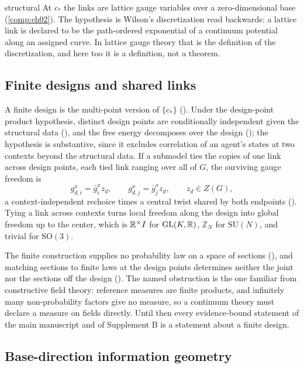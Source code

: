 \begin{analogy}{structural}
At \(c_*\) the links are lattice gauge variables over a zero-dimensional base (\cref{comp:ch02}). The
hypothesis is Wilson's discretization read backwards: a lattice link is declared to be the path-ordered
exponential of a continuum potential along an assigned curve. In lattice gauge theory that is the
definition of the discretization, and here too it is a definition, not a theorem.
\end{analogy}

\subsection{Finite designs and shared links}
\label{comp:sb-designs}

A finite design is the multi-point version of \(\{c_*\}\) (). Under the
design-point product hypothesis, distinct design points are conditionally independent given the
structural data (), and the free energy decomposes over the design
(); the hypothesis is substantive, since it excludes
correlation of an agent's states at two contexts beyond the structural data. If a submodel ties the
copies of one link across design points, each tied link ranging over all of \(G\), the surviving gauge
freedom is
\[
g_{d,i}^x=\bar g_i^xz_d,\qquad g_{d,j}^x=\bar g_j^xz_d,\qquad z_d\in Z(G),
\]
a context-independent rechoice times a central twist shared by both endpoints
(). Tying a link across contexts turns local freedom along the design
into global freedom up to the center, which is \(\mathbb R^\times I\) for \(\mathrm{GL}(K,\mathbb R)\), \(\mathbb Z_N\) for
\(\mathrm{SU}(N)\), and trivial for \(\mathrm{SO}(3)\).

The finite construction supplies no probability law on a space of sections
(), and matching sections to finite laws at the design points determines
neither the joint nor the sections off the design (). The
named obstruction is the one familiar from constructive field theory: reference measures are finite
products, and infinitely many non-probability factors give no measure, so a continuum theory must declare
a measure on fields directly. Until then every evidence-bound statement of the main manuscript and of
Supplement B is a statement about a finite design.

\subsection{Base-direction information geometry}
\label{comp:sb-pullback}


